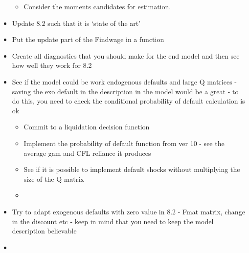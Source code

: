 \documentclass[12pt]{article}
\begin{document}
\begin{itemize}
\begin{itemize}
        \item Consider the moments candidates for estimation. \checkmark
    \end{itemize}
    \item Update 8.2 such that it is `state of the art' \checkmark
    \item Put the update part of the Findwage in a function
    \item Create all diagnostics that you should make for the end model and then see how well they work for 8.2
    \item See if the model could be work endogenous defaults and large Q matrices - saving the exo default in the description in the model would be a great - to do this, you need to check the conditional probability of default calculation is ok
    \begin{itemize}
        \item Commit to a liquidation decision function
        \item Implement the probability of default function from ver 10 - see the average gam and CFL reliance it produces
        \item See if it is possible to implement default shocks without multiplying the size of the Q matrix
        \item 
    \end{itemize}
    \item Try to adapt exogenous defaults with zero value in 8.2 - Fmat matrix, change in the discount etc - keep in mind that you need to keep the model description believable
    \item 
\end{itemize} \normalsize
\newpage
\end{document}
